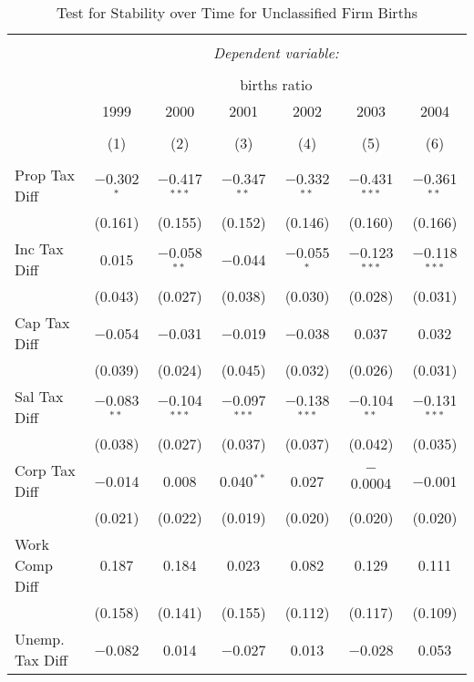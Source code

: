 
\begin{table}[!htbp] \centering 
  \caption{Test for Stability over Time for  Unclassified Firm Births} 
  \label{99year} 
\small 
\begin{tabular}{@{\extracolsep{5pt}}lcccccc} 
\\[-1.8ex]\hline 
\hline \\[-1.8ex] 
 & \multicolumn{6}{c}{\textit{Dependent variable:}} \\ 
\cline{2-7} 
\\[-1.8ex] & \multicolumn{6}{c}{births ratio} \\ 
 & 1999 & 2000 & 2001 & 2002 & 2003 & 2004 \\ 
\\[-1.8ex] & (1) & (2) & (3) & (4) & (5) & (6)\\ 
\hline \\[-1.8ex] 
 Prop Tax Diff & $-$0.302$^{*}$ & $-$0.417$^{***}$ & $-$0.347$^{**}$ & $-$0.332$^{**}$ & $-$0.431$^{***}$ & $-$0.361$^{**}$ \\ 
  & (0.161) & (0.155) & (0.152) & (0.146) & (0.160) & (0.166) \\ 
  Inc Tax Diff & 0.015 & $-$0.058$^{**}$ & $-$0.044 & $-$0.055$^{*}$ & $-$0.123$^{***}$ & $-$0.118$^{***}$ \\ 
  & (0.043) & (0.027) & (0.038) & (0.030) & (0.028) & (0.031) \\ 
  Cap Tax Diff & $-$0.054 & $-$0.031 & $-$0.019 & $-$0.038 & 0.037 & 0.032 \\ 
  & (0.039) & (0.024) & (0.045) & (0.032) & (0.026) & (0.031) \\ 
  Sal Tax Diff & $-$0.083$^{**}$ & $-$0.104$^{***}$ & $-$0.097$^{***}$ & $-$0.138$^{***}$ & $-$0.104$^{**}$ & $-$0.131$^{***}$ \\ 
  & (0.038) & (0.027) & (0.037) & (0.037) & (0.042) & (0.035) \\ 
  Corp Tax Diff & $-$0.014 & 0.008 & 0.040$^{**}$ & 0.027 & $-$0.0004 & $-$0.001 \\ 
  & (0.021) & (0.022) & (0.019) & (0.020) & (0.020) & (0.020) \\ 
  Work Comp Diff & 0.187 & 0.184 & 0.023 & 0.082 & 0.129 & 0.111 \\ 
  & (0.158) & (0.141) & (0.155) & (0.112) & (0.117) & (0.109) \\ 
  Unemp. Tax Diff & $-$0.082 & 0.014 & $-$0.027 & 0.013 & $-$0.028 & 0.053 \\ 

\end{tabular}
\end{table}
